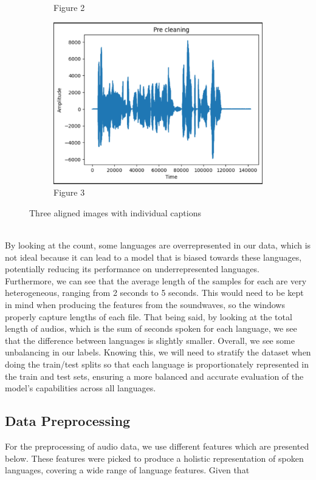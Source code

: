 \documentclass[twocolumn]{article}
\begin{document}
\begin{figure}[h]
\begin{subfigure}[b]{0.3\textwidth}
        \caption{Figure 2}
        \label{fig:image2}
    \end{subfigure}
    \hfill
    \begin{subfigure}[b]{0.3\textwidth}
        \centering
        \includegraphics[width=\linewidth]{images/pre_cleaning.png}
        \caption{Figure 3}
        \label{fig:image3}
    \end{subfigure}
    \caption{Three aligned images with individual captions}
    \label{fig:three_images}
\end{figure}\\
By looking at the count, some languages are overrepresented in our data, which is not ideal because it can lead to a model that is biased towards these languages, potentially reducing its performance on underrepresented languages. Furthermore, we can see that the average length of the samples for each are very heterogeneous, ranging from 2 seconds to 5 seconds. This would need to be kept in mind when producing the features from the soundwaves, so the windows properly capture lengths of each file. That being said, by looking at the total length of audios, which is the sum of seconds spoken for each language, we see that the difference between languages is slightly smaller. Overall, we see some unbalancing in our labels. Knowing this, we will need to stratify the dataset when doing the train/test splits so that each language is proportionately represented in the train and test sets, ensuring a more balanced and accurate evaluation of the model's capabilities across all languages.

\subsection{Data Preprocessing}
For the preprocessing of audio data, we use different features which are presented below. These features were picked to produce a holistic representation of spoken languages, covering a wide range of language features. Given that 
\end{document}
